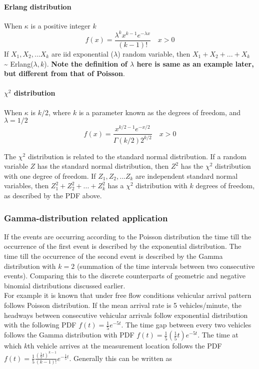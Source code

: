 \documentclass[11pt]{article}
\begin{document}
\paragraph{Erlang distribution}\label{erlang-distribution}

When \(\kappa\) is a positive integer \(k\)
\[f(x) = \frac{\lambda^{k}x^{k-1}e^{-\lambda x}}{(k-1)!} \quad x > 0\]
If \(X_1, X_2,...X_k\) are iid exponential (\(\lambda\)) random
variable, then \(X_1+X_2+...+X_k\) \textasciitilde{}
Erlang(\(\lambda, k\)). \textbf{Note the definition of \(\lambda\) here
is same as an example later, but different from that of Poisson}.

\paragraph{\texorpdfstring{\(\chi^2\)
distribution}{\textbackslash{}chi\^{}2 distribution}}\label{chi2-distribution}

When \(\kappa\) is \(k/2\), where \(k\) is a parameter known as the
degrees of freedom, and \(\lambda = 1/2\)
\[f(x) = \frac{x^{k/2-1}e^{-x/2}}{\Gamma(k/2)2^{k/2}} \quad x>0\]

The \(\chi^2\) distribution is related to the standard normal
distribution. If a random variable \(Z\) has the standard normal
distribution, then \(Z^2\) has the \(\chi^2\) distribution with one
degree of freedom. If \(Z_1, Z_2,...Z_k\) are independent standard
normal variables, then \(Z_1^2+Z_2^2+...+Z_k^2\) has a \(\chi^2\)
distribution with \(k\) degrees of freedom, as described by the PDF
above.

    \subsubsection{Gamma-distribution related
application}\label{gamma-distribution-related-application}

If the events are occurring according to the Poisson distribution the
time till the occurrence of the first event is described by the
exponential distribution. The time till the occurrence of the second
event is described by the Gamma distribution with \(k =2\) (summation of
the time intervals between two consecutive events). Comparing this to
the discrete counterparts of geometric and negative binomial
distributions discussed earlier.\\
For example it is known that under free flow conditions vehicular
arrival pattern follows Poisson distribution. If the mean arrival rate
is 5 vehicles/minute, the headways between consecutive vehicular
arrivals follow exponential distribution with the following PDF
\(f(t) = \frac{1}{5}e^{-5t}\). The time gap between every two vehicles
follows the Gamma distribution with PDF
\(f(t) = \frac{1}{5}(\frac{1}{5}t)e^{-5t}\). The time at which \(k\)th
vehicle arrives at the measurement location follows the PDF
\(f(t) = \frac{1}{5}\frac{(\frac{1}{5}t)^{k-1}}{(k-1)!}e^{-\frac{1}{5}t}\).
Generally this can be written as
\end{document}
